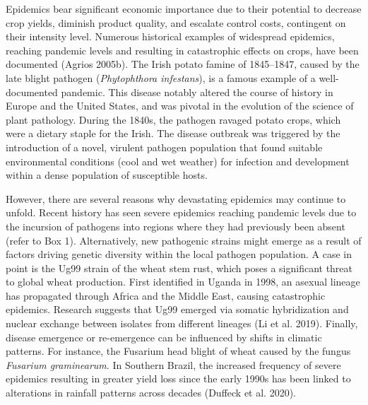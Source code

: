 \documentclass[
  letterpaper,
]{book}
\begin{document}
Epidemics bear significant economic importance due to their potential to
decrease crop yields, diminish product quality, and escalate control
costs, contingent on their intensity level. Numerous historical examples
of widespread epidemics, reaching pandemic levels and resulting in
catastrophic effects on crops, have been documented (Agrios 2005b). The
Irish potato famine of 1845--1847, caused by the late blight pathogen
(\emph{Phytophthora infestans}), is a famous example of a
well-documented pandemic. This disease notably altered the course of
history in Europe and the United States, and was pivotal in the
evolution of the science of plant pathology. During the 1840s, the
pathogen ravaged potato crops, which were a dietary staple for the
Irish. The disease outbreak was triggered by the introduction of a
novel, virulent pathogen population that found suitable environmental
conditions (cool and wet weather) for infection and development within a
dense population of susceptible hosts.

However, there are several reasons why devastating epidemics may
continue to unfold. Recent history has seen severe epidemics reaching
pandemic levels due to the incursion of pathogens into regions where
they had previously been absent (refer to Box 1). Alternatively, new
pathogenic strains might emerge as a result of factors driving genetic
diversity within the local pathogen population. A case in point is the
Ug99 strain of the wheat stem rust, which poses a significant threat to
global wheat production. First identified in Uganda in 1998, an asexual
lineage has propagated through Africa and the Middle East, causing
catastrophic epidemics. Research suggests that Ug99 emerged via somatic
hybridization and nuclear exchange between isolates from different
lineages (Li et al. 2019). Finally, disease emergence or re-emergence
can be influenced by shifts in climatic patterns. For instance, the
Fusarium head blight of wheat caused by the fungus \emph{Fusarium
graminearum}. In Southern Brazil, the increased frequency of severe
epidemics resulting in greater yield loss since the early 1990s has been
linked to alterations in rainfall patterns across decades (Duffeck et
al. 2020).
\end{document}
